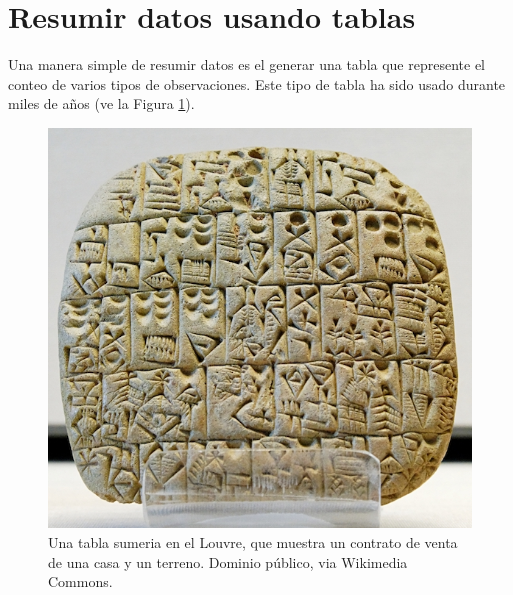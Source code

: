 \documentclass[
  12pt,
]{book}
\begin{document}
\hypertarget{resumir-datos-usando-tablas}{%
\section{Resumir datos usando tablas}\label{resumir-datos-usando-tablas}}

Una manera simple de resumir datos es el generar una tabla que represente el conteo de varios tipos de observaciones. Este tipo de tabla ha sido usado durante miles de años (ve la Figura \ref{fig:salesContract}).

\begin{figure}
\includegraphics[width=8in,height=0.3\textheight]{images/Sales_contract_Shuruppak_Louvre_AO3760} \caption{Una tabla sumeria en el Louvre, que muestra un contrato de venta de una casa y un terreno. Dominio público, via Wikimedia Commons.}\label{fig:salesContract}
\end{figure}
\end{document}
